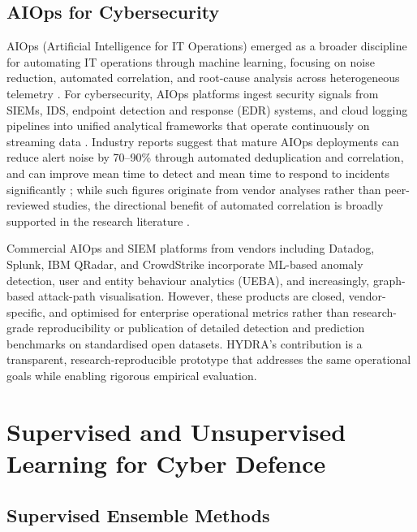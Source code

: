 \documentclass[12pt,a4paper]{report}
\begin{document}
\subsection{AIOps for Cybersecurity}
\label{sec:aiops}

AIOps (Artificial Intelligence for IT Operations) emerged as a broader discipline for automating IT operations through machine learning, focusing on noise reduction, automated correlation, and root-cause analysis across heterogeneous telemetry \citep{dang2023}. For cybersecurity, AIOps platforms ingest security signals from SIEMs, IDS, endpoint detection and response (EDR) systems, and cloud logging pipelines into unified analytical frameworks that operate continuously on streaming data \citep{dang2023}. Industry reports suggest that mature AIOps deployments can reduce alert noise by 70--90\% through automated deduplication and correlation, and can improve mean time to detect and mean time to respond to incidents significantly \citep{dang2023,fortinet2025}; while such figures originate from vendor analyses rather than peer-reviewed studies, the directional benefit of automated correlation is broadly supported in the research literature \citep{dang2023,zhu2023}.

Commercial AIOps and SIEM platforms from vendors including Datadog, Splunk, IBM QRadar, and CrowdStrike incorporate ML-based anomaly detection, user and entity behaviour analytics (UEBA), and increasingly, graph-based attack-path visualisation. However, these products are closed, vendor-specific, and optimised for enterprise operational metrics rather than research-grade reproducibility or publication of detailed detection and prediction benchmarks on standardised open datasets. HYDRA's contribution is a transparent, research-reproducible prototype that addresses the same operational goals while enabling rigorous empirical evaluation.

\section{Supervised and Unsupervised Learning for Cyber Defence}
\label{sec:supervised}

\subsection{Supervised Ensemble Methods}
\label{sec:ensemble}
\end{document}
